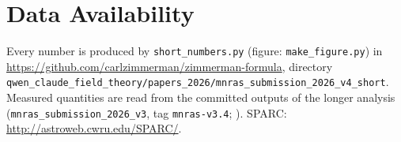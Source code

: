 \documentclass[fleqn,usenatbib]{mnras}
\begin{document}
\section*{Data Availability}
Every number is produced by \texttt{short\_numbers.py} (figure: \texttt{make\_figure.py}) in \url{https://github.com/carlzimmerman/zimmerman-formula}, directory \nolinkurl{qwen_claude_field_theory/papers_2026/mnras_submission_2026_v4_short}. Measured quantities are read from the committed outputs of the longer analysis (\nolinkurl{mnras_submission_2026_v3}, tag \texttt{mnras-v3.4}; \citealt{Zimmerman2026long}). SPARC: \url{http://astroweb.cwru.edu/SPARC/}.




\bsp
\label{lastpage}
\end{document}
